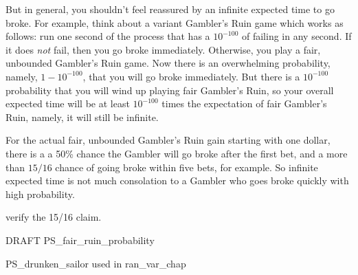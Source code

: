 But in general, you shouldn't feel reassured by an infinite expected
time to go broke.  For example, think about a variant Gambler's Ruin
game which works as follows: run one second of the process that has a
$10^{-100}$ of failing in any second.  If it does \emph{not} fail,
then you go broke immediately.  Otherwise, you play a fair, unbounded
Gambler's Ruin game.  Now there is an overwhelming probability,
namely, $1-10^{-100}$, that you will go broke immediately.  But there
is a $10^{-100}$ probability that you will wind up playing fair
Gambler's Ruin, so your overall expected time will be at least
$10^{-100}$ times the expectation of fair Gambler's Ruin, namely, it
will still be infinite.

For the actual fair, unbounded Gambler's Ruin gain starting with one
dollar, there is a a 50\% chance the Gambler will go broke after the
first bet, and a more than $15/16$ chance of going broke within five
bets, for example.  So infinite expected time is not much consolation
to a Gambler who goes broke quickly with high probability.

\begin{editingnotes}
verify the 15/16 claim.
\end{editingnotes}

\iffalse

But don't assume this means that the
gambler is \emph{likely} to play for long---there is even a 50\%
chance he will lose the very first bet and go broke right away.

In fact, if the game is unfavorable, then
Theorem~\ref{LN12:ExQthm} and Corollary~\ref{LN12:biaswincor} imply
that his expected time to go broke is essentially proportional to his
initial capital, that is, $\Theta(n)$.

Lemma~\ref{LN12:play forever} says that the gambler can ``expect'' to
play forever, while Lemma~\ref{LN12:go broke} says that he is certain
to go broke.

These facts sound contradictory, but they are sound
consequences of the technical mathematical definition of expectation.
The moral here, as in Section~\ref{infinite_expect_sec}, is that naive
intuition is unreliable when it comes to infinite expectation.

\fi

\begin{problems}
\practiceproblems
{}

\classproblems
{}

\begin{editingnotes}
\homeworkproblems
DRAFT PS\_fair\_ruin\_probability

PS\_drunken\_sailor used in ran\_var\_chap
\end{editingnotes}

\end{problems}

